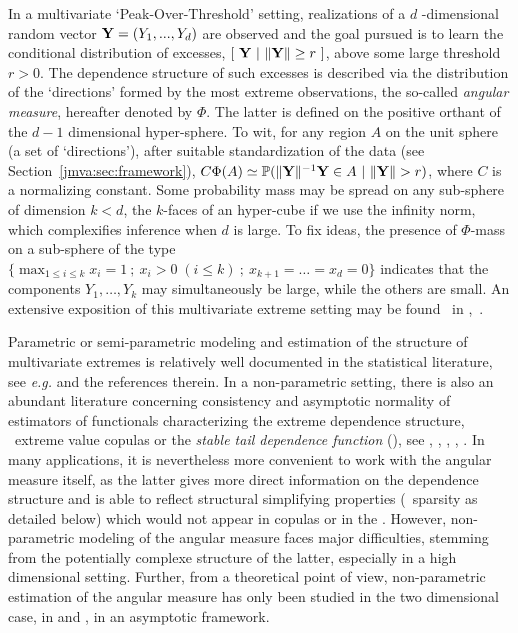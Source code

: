 In a multivariate `Peak-Over-Threshold' setting, realizations of a $d$ -dimensional random vector $\mathbf Y = (Y_1 ,..., Y_d)$ are observed and the goal pursued is to learn the conditional distribution of excesses, $\left[~ \mathbf Y ~|~ \|\mathbf Y\| \ge  r ~ \right]$, above some large threshold $ r>0$.
The dependence structure of such excesses is described via the
distribution of the ‘directions’ formed by the most extreme
observations, the  so-called \emph{angular measure}, hereafter denoted by $\Phi$.  The latter
is defined on the positive orthant of the $d-1$ dimensional
hyper-sphere. To wit, for any region $A$  on the unit sphere (a set
of `directions'), after suitable standardization of the data (see
 Section~\ref{jmva:sec:framework}), 
$C \Phi(A) \simeq \mathbb{P}(\|\mathbf Y\|^{-1} \mathbf Y \in A ~|~ \|\mathbf Y\| >r)$, where $C$ is a normalizing constant. 
Some probability mass may be spread on any sub-sphere of dimension $k
< d$, the $k$-faces of an hyper-cube if we use the infinity norm, which
complexifies inference when $d$ is large. To fix ideas, the presence of $\Phi$-mass on a
sub-sphere of the type $\{\max_{1\leq i\leq k} x_i = 1 ~;~   x_i >0 \;(i\le k) ~;~  x_{k+1} = \ldots = x_d = 0\}$ indicates that the components $Y_1,\ldots,Y_k$ may
simultaneously be large, while the others are small.
An extensive exposition of this multivariate extreme setting may be found \eg~in \cite{Resnick1987},~\cite{BGTS04}. 



Parametric or semi-parametric modeling and estimation of the structure of
multivariate extremes is relatively well documented in the statistical literature, see \emph{e.g.} \cite{coles1991modeling,fougeres2009models,cooley2010pairwise,sabourinNaveau2012} and the references therein. In a non-parametric setting, there is also an abundant literature concerning consistency and asymptotic normality of estimators of functionals characterizing the extreme dependence structure, \eg~extreme value copulas or the \emph{stable tail dependence function} (\stdf), see \cite{Segers12Bernoulli}, \cite{Drees98}, \cite{Embrechts2000}, \cite{Einmahl2012}, \cite{dHF06}. 
In many applications, it is nevertheless more convenient to work with the angular measure itself, as the latter gives more direct information on the dependence structure and is able to reflect structural simplifying properties (\eg~sparsity as detailed below) which would not appear in copulas or in the \stdf.
However, non-parametric modeling of the angular measure faces major difficulties, stemming from the potentially complexe structure of the latter, especially in a high dimensional setting.
Further, from a theoretical point of view, non-parametric estimation of the angular measure has only been studied in the two dimensional case, in \cite{Einmahl2001} and \cite{Einmahl2009}, in an asymptotic framework.

